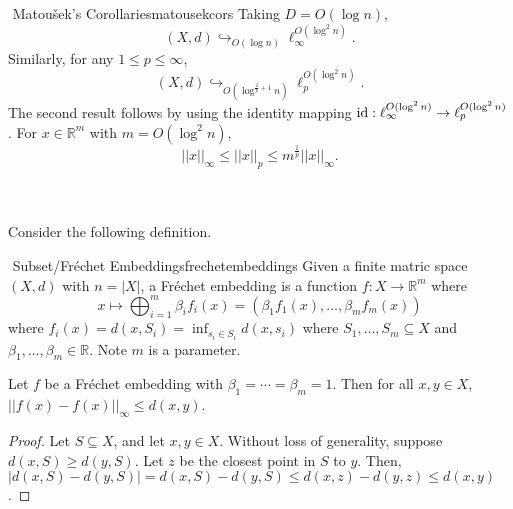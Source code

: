         \pagebreak
        \begin{corollary}{\Stop\,\,Matou\v{s}ek's Corollaries}{matousekcors}
            Taking \(D=O(\log n)\), 
            \begin{equation*}
                (X,d)\hookrightarrow_{O(\log n)}\ell_\infty^{O(\log^2n)}.
            \end{equation*}
            Similarly, for any \(1\leq p\leq\infty\),
            \begin{equation*}
                (X,d)\hookrightarrow_{O\left(\log^{\frac{2}{p}+1}n\right)}\ell_p^{O(\log^2n)}.
            \end{equation*}
            The second result follows by using the identity mapping \(\operatorname{id}:\ell_\infty^{O(\log^2n)}\to\ell_p^{O(\log^2n)}\). For \(x\in\mathbb{R}^m\) with \(m=O(\log^2n)\),
            \begin{equation*}
                ||x||_\infty\leq||x||_p\leq m^\frac{1}{p}||x||_\infty.
            \end{equation*} 
        \end{corollary}
        \vphantom
        \\
        \\
        Consider the following definition.
        \begin{definition}{\Stop\,\,Subset/Fr\'echet Embeddings}{frechetembeddings}
            Given a finite matric space \((X,d)\) with \(n=|X|\), a Fr\'echet embedding is a function \(f:X\to\mathbb{R}^m\) where
            \begin{equation*}
                x\mapsto\bigoplus_{i=1}^m \beta_i f_i(x)=(\beta_1 f_1(x),\ldots,\beta_m f_m(x))
            \end{equation*}
            where \(f_i(x)=d(x,S_i)=\inf_{s_i\in S_i}d(x,s_i)\) where \(S_1,\ldots,S_m\subseteq X\) and \(\beta_1,\ldots,\beta_m\in\mathbb{R}\). Note \(m\) is a parameter.
        \end{definition}
        \begin{lemma*}
            Let \(f\) be a Fr\'echet embedding with \(\beta_1=\cdots=\beta_m=1\). Then for all \(x,y\in X\), \(||f(x)-f(x)||_\infty\leq d(x,y)\).
            \begin{proof}
                Let \(S\subseteq X\), and let \(x,y\in X\). Without loss of generality, suppose \(d(x,S)\geq d(y,S)\). Let \(z\) be the closest point in \(S\) to \(y\). Then, \(|d(x,S)-d(y,S)|=d(x,S)-d(y,S)\leq d(x,z)-d(y,z)\leq d(x,y)\).
            \end{proof}
        \end{lemma*}